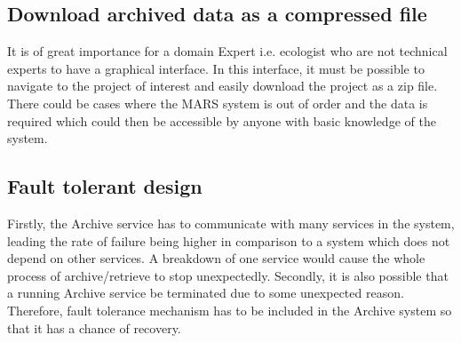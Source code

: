         \subsection{Download archived data as a compressed file}
            It is of great importance for a domain Expert i.e. ecologist who are not technical experts to have a graphical interface. In this interface,
            it must be possible to navigate to the project of interest and easily download the project as a zip file. There could be cases where the
            MARS system is out of order and the data is required which could then be accessible by anyone with basic knowledge of the system.
        
        \subsection{Fault tolerant design}   
        Firstly, the Archive service has to communicate with many services in the system, leading the rate of failure being higher
        in comparison to a system which does not depend on other services. A breakdown 
        of one service would cause the whole process of archive/retrieve to stop unexpectedly.  Secondly, it is also possible that a running Archive service be terminated
        due to some unexpected reason. Therefore, fault tolerance mechanism has to be included in the Archive system so that it has a chance of 
        recovery. 
